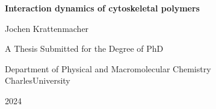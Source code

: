 \thispagestyle{empty}
\begin{center}
    \vspace*{0.5in}
    \Large{\bf{Interaction dynamics of cytoskeletal polymers}}
    \\
    \vspace{2.5in}

    \large{Jochen Krattenmacher} \\
    \vspace{2.5in}

    \large{A Thesis Submitted for the Degree of PhD}
    \vspace{0.2in}

    \large{Department of Physical and Macromolecular Chemistry} \\
    \large{CharlesUniversity} \\
    \vspace{0.2in} 

    \large{2024}
\end{center}
\SgIntClearDoublePage